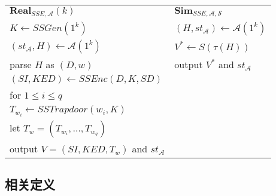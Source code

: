 
\begin{center}
\begin{tabular}{ l l }
    $\textbf{Real}_{SSE,\mathcal{A}}(k)$  &  $\textbf{Sim}_{SSE,\mathcal{A},\mathcal{S}}$    \\
    \quad $K \leftarrow SSGen(1^k)$ & \quad $(H,st_\mathcal{A}) \leftarrow \mathcal{A}(1^k)$ \\
    \quad $(st_\mathcal{A},H) \leftarrow \mathcal{A}(1^k)$ &\quad $V^* \leftarrow S(\tau (H))$\\
    \quad parse $H$ as $(D,w)$          &   \quad output $V^*$ and $st_\mathcal{A}$     \\
    \quad $(SI,KED) \leftarrow SSEnc(D,K,SD)$            &   \\
    \quad for $1 \leq i \leq q $                 &   \\
    \quad \quad $T_{w_i} \leftarrow SSTrapdoor(w_i,K)$    &   \\
    \quad let $T_w = (T_{w_i}, ..., T_{w_q})$              &    \\
    \quad output $V = (SI,KED,T_w)$ and $st_\mathcal{A}$    &
\end{tabular}
\end{center}



\subsection{相关定义}
\label{sec:synonym_model_related_definition}

